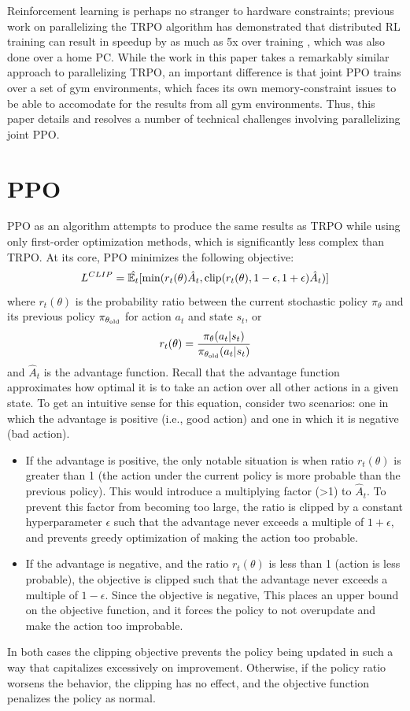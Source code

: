 \documentclass{article}
\begin{document}
Reinforcement learning is perhaps no stranger to hardware constraints; previous work on parallelizing the TRPO algorithm \cite{DBLP:journals/corr/SchulmanLMJA15} has demonstrated that distributed RL training can result in speedup by as much as 5x over training \cite{frans2016parallel}, which was also done over a home PC. While the work in this paper takes a remarkably similar approach to parallelizing TRPO, an important difference is that joint PPO trains over a set of gym environments, which faces its own memory-constraint issues to be able to accomodate for the results from all gym environments. Thus, this paper details and resolves a number of technical challenges involving parallelizing joint PPO.

\section{PPO}
PPO as an algorithm attempts to produce the same results as TRPO while using only first-order optimization methods, which is significantly less complex than TRPO. At its core, PPO minimizes the following objective:
\[
  L^{CLIP} = \hat{\mathbb{E}_t}[\textnormal{min}(r_t(\theta)\hat{A}_t, \textnormal{clip}(r_t(\theta),1-\epsilon, 1+\epsilon)\hat{A}_t)]
\]
where $r_t(\theta)$ is the probability ratio between the current stochastic policy $\pi_{\theta}$ and its previous policy $\pi_{\theta_{\textmd{old}}}$ for action $a_t$ and state $s_t$, or 
\[r_t(\theta) = \frac{\pi_{\theta}(a_t | s_t)}{\pi_{\theta_{\textnormal{old}}}(a_t | s_t )}\] and $\hat{A}_t$ is the advantage function. Recall that the advantage function approximates how optimal it is to take an action over all other actions in a given state. To get an intuitive sense for this equation, consider two scenarios: one in which the advantage is positive (i.e., good action) and one in which it is negative (bad action).
\begin{itemize}
  \item If the advantage is positive, the only notable situation is when ratio $r_t(\theta)$ is greater than 1 (the action under the current policy is more probable than the previous policy). This would introduce a multiplying factor (>1) to $\hat{A}_t$. To prevent this factor from becoming too large, the ratio is clipped by a constant hyperparameter $\epsilon$ such that the advantage never exceeds a multiple of $1 + \epsilon$, and prevents greedy optimization of making the action too probable.
  \item If the advantage is negative, and the ratio $r_t(\theta)$ is less than 1 (action is less probable), the objective is clipped such that the advantage never exceeds a multiple of $1-\epsilon$. Since the objective is negative, This places an upper bound on the objective function, and it forces the policy to not overupdate and make the action too improbable. 
\end{itemize}
In both cases the clipping objective prevents the policy being updated in such a way that capitalizes excessively on improvement. Otherwise, if the policy ratio worsens the behavior, the clipping has no effect, and the objective function penalizes the policy as normal.
\end{document}

